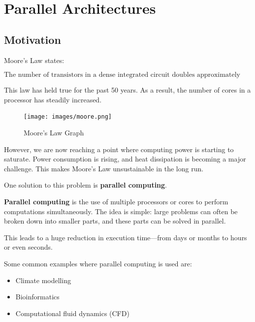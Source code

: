\documentclass[12pt]{book}
\begin{document}
 














\chapter{Parallel Architectures}

\section{Motivation}

Moore's Law states:

\begin{equation}
    \text{The number of transistors in a dense integrated circuit doubles approximately every two years.}
\end{equation}

This law has held true for the past 50 years. As a result, the number of cores in a processor has steadily increased.

\begin{figure}[H]
    \centering
    \texttt{[image: images/moore.png]}
    \caption{Moore's Law Graph}
\end{figure} 

However, we are now reaching a point where computing power is starting to saturate. Power consumption is rising, and heat dissipation is becoming a major challenge. This makes Moore's Law unsustainable in the long run.

One solution to this problem is \textbf{parallel computing}.

\vspace{0.3cm}

\textbf{Parallel computing} is the use of multiple processors or cores to perform computations simultaneously. The idea is simple: large problems can often be broken down into smaller parts, and these parts can be solved in parallel.

This leads to a huge reduction in execution time—from days or months to hours or even seconds. 

Some common examples where parallel computing is used are:
\begin{itemize}
    \item Climate modelling
    \item Bioinformatics
    \item Computational fluid dynamics (CFD)
\end{itemize}
\end{document}
